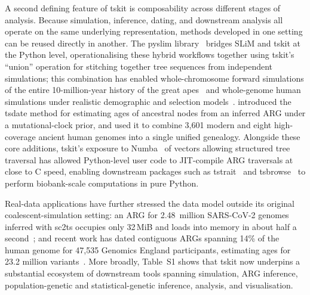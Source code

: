 \documentclass{article}
\begin{document}
A second defining feature of tskit is composability across different
stages of analysis.
Because simulation, inference, dating, and downstream analysis all
operate on the same underlying representation, methods developed in
one setting can be reused directly in another.
The pyslim library~\citep{gopalan2025bridging} bridges SLiM and tskit
at the Python level, operationalising these hybrid workflows together
using tskit's ``union'' operation for stitching together tree
sequences from independent simulations; this combination has enabled
whole-chromosome forward simulations of the entire 10-million-year
history of the great apes~\citep{rodrigues2024shared} and
whole-genome human simulations under realistic demographic and
selection models~\citep{haller2025simHumanity}.
\citet{wohns2022unified} introduced the tsdate method for estimating
ages of ancestral nodes from an inferred ARG under a mutational-clock
prior, and used it to combine 3{,}601 modern and eight high-coverage
ancient human genomes into a single unified genealogy.
Alongside these core additions, tskit's exposure to Numba~\citep{lam2015numba} 
of vectors allowing structured tree traversal
has allowed Python-level user code to JIT-compile ARG traversals at close to C speed,
enabling downstream packages such as
tstrait~\citep{tagami2024tstrait} and
tsbrowse~\citep{karthikeyan2025tsbrowse}
to perform biobank-scale computations in pure Python.

Real-data applications have further stressed the data model outside
its original coalescent-simulation setting: an ARG for 2.48~million
SARS-CoV-2 genomes inferred with sc2ts occupies only 32\,MiB and
loads into memory in about half a
second~\citep{zhan2025pandemic}; and recent work has dated contiguous
ARGs spanning 14\% of the human genome for 47,535 Genomics England
participants, estimating ages for 23.2 million
variants~\citep{pope2026tracing}.
More broadly, Table~S1 shows that tskit now underpins a substantial
ecosystem of downstream tools spanning simulation, ARG inference,
population-genetic and statistical-genetic inference, analysis, and
visualisation.
\end{document}
